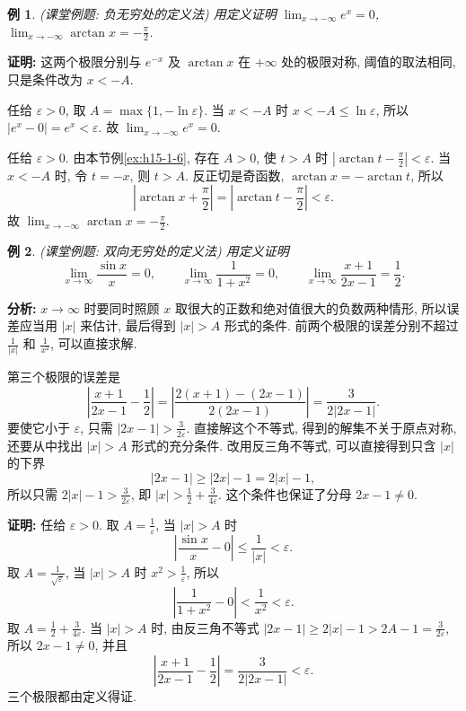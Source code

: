 \documentclass[UTF8,openany]{ctexbook}
\theoremstyle{chinesetextbook}
\newtheorem{example}{例}[section]
\newenvironment{cnproof}{\par\indent\textbf{证明:} \ignorespaces}{\par}
\begin{document}
\begin{example}
\textnormal{(课堂例题: 负无穷处的定义法)} 用定义证明 $\displaystyle\lim_{x\to-\infty}e^x=0$, $\displaystyle\lim_{x\to-\infty}\arctan x=-\frac\pi2$.
\end{example}
\begin{cnproof}
这两个极限分别与 $e^{-x}$ 及 $\arctan x$ 在 $+\infty$ 处的极限对称, 阈值的取法相同, 只是条件改为 $x<-A$.

任给 $\varepsilon>0$, 取 $A=\max\{1,-\ln\varepsilon\}$. 当 $x<-A$ 时 $x<-A\le\ln\varepsilon$, 所以 $|e^x-0|=e^x<\varepsilon$. 故 $\displaystyle\lim_{x\to-\infty}e^x=0$.

任给 $\varepsilon>0$. 由本节例\ref{ex:h15-1-6}, 存在 $A>0$, 使 $t>A$ 时 $\displaystyle\left|\arctan t-\frac\pi2\right|<\varepsilon$. 当 $x<-A$ 时, 令 $t=-x$, 则 $t>A$. 反正切是奇函数, $\arctan x=-\arctan t$, 所以
\[
\left|\arctan x+\frac\pi2\right|=\left|\arctan t-\frac\pi2\right|<\varepsilon.
\]
故 $\displaystyle\lim_{x\to-\infty}\arctan x=-\frac\pi2$.
\end{cnproof}
\begin{example}
\textnormal{(课堂例题: 双向无穷处的定义法)} 用定义证明
\[
\lim_{x\to\infty}\frac{\sin x}x=0,\qquad\lim_{x\to\infty}\frac1{1+x^2}=0,\qquad\lim_{x\to\infty}\frac{x+1}{2x-1}=\frac12.
\]
\end{example}
\par\indent\textbf{分析:} $x\to\infty$ 时要同时照顾 $x$ 取很大的正数和绝对值很大的负数两种情形, 所以误差应当用 $|x|$ 来估计, 最后得到 $|x|>A$ 形式的条件. 前两个极限的误差分别不超过 $\displaystyle\frac1{|x|}$ 和 $\displaystyle\frac1{x^2}$, 可以直接求解.

第三个极限的误差是
\[
\left|\frac{x+1}{2x-1}-\frac12\right|=\left|\frac{2(x+1)-(2x-1)}{2(2x-1)}\right|=\frac3{2|2x-1|}.
\]
要使它小于 $\varepsilon$, 只需 $\displaystyle|2x-1|>\frac3{2\varepsilon}$. 直接解这个不等式, 得到的解集不关于原点对称, 还要从中找出 $|x|>A$ 形式的充分条件. 改用反三角不等式, 可以直接得到只含 $|x|$ 的下界
\[
|2x-1|\ge|2x|-1=2|x|-1,
\]
所以只需 $\displaystyle2|x|-1>\frac3{2\varepsilon}$, 即 $\displaystyle|x|>\frac12+\frac3{4\varepsilon}$. 这个条件也保证了分母 $2x-1\ne0$.
\begin{cnproof}
任给 $\varepsilon>0$. 取 $\displaystyle A=\frac1\varepsilon$, 当 $|x|>A$ 时
\[
\left|\frac{\sin x}x-0\right|\le\frac1{|x|}<\varepsilon.
\]
取 $\displaystyle A=\frac1{\sqrt\varepsilon}$, 当 $|x|>A$ 时 $\displaystyle x^2>\frac1\varepsilon$, 所以
\[
\left|\frac1{1+x^2}-0\right|<\frac1{x^2}<\varepsilon.
\]
取 $\displaystyle A=\frac12+\frac3{4\varepsilon}$. 当 $|x|>A$ 时, 由反三角不等式 $\displaystyle|2x-1|\ge2|x|-1>2A-1=\frac3{2\varepsilon}$, 所以 $2x-1\ne0$, 并且
\[
\left|\frac{x+1}{2x-1}-\frac12\right|=\frac3{2|2x-1|}<\varepsilon.
\]
三个极限都由定义得证.
\end{cnproof}
\end{document}
